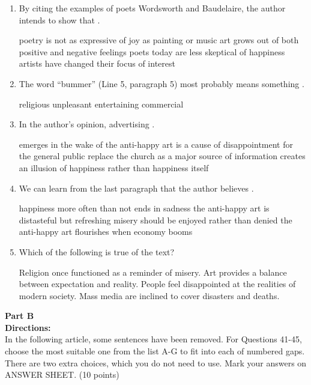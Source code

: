 \begin{enumerate}[resume]
	\item
By citing the examples of poets Wordsworth and Baudelaire,
the author intends to show that \lineread.


\fourchoices
{poetry is not as expressive of joy as painting or music}
{art grows out of both positive and negative feelings}
{poets today are less skeptical of happiness}
{artists have changed their focus of interest}



\item
The word ``bummer'' (Line 5, paragraph 5) most probably
means something \lineread.


\fourchoices
{religious}
{unpleasant}
{entertaining}
{commercial}


\item
In the author's opinion, advertising \lineread.


\fourchoices
{emerges in the wake of the anti-happy art}
{is a cause of disappointment for the general public}
{replace the church as a major source of information}
{creates an illusion of happiness rather than happiness itself}


\item
We can learn from the last paragraph that the author
believes \lineread.


\fourchoices
{happiness more often than not ends in sadness}
{the anti-happy art is distasteful but refreshing}
{misery should be enjoyed rather than denied}
{the anti-happy art flourishes when economy booms}



\item
Which of the following is true of the text?


\fourchoices
{Religion once functioned as a reminder of misery.}
{Art provides a balance between expectation and reality.}
{People feel disappointed at the realities of modern society.}
{Mass media are inclined to cover disasters and deaths.}


\end{enumerate}


\newpage
\noindent
\textbf{Part B}\\
\textbf{Directions:}\\
In the following article, some sentences have been removed. For
Questions 41-45, choose the most suitable one from the list A-G to fit
into each of numbered gaps. There are two extra choices, which you do
not need to use. Mark your answers on ANSWER SHEET. (10 points)



